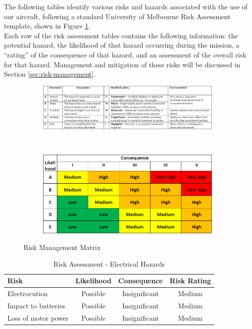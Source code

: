 \label{sec:risk-assessment}
The following tables identify various risks and hazards associated with the use of our aircraft, following a standard University of Melbourne Risk Assessment template, shown in Figure \ref{fig:risk-matrix}.\\

Each row of the risk assessment tables contains the following information: the potential hazard, the likelihood of that hazard occurring during the mission, a ``rating'' of the consequence of that hazard, and an assessment of the overall risk for that hazard. Management and mitigation of these risks will be discussed in Section \ref{sec:risk-management}.

\begin{figure}[H]
	
	\begin{subfigure}{\linewidth}
		\centerline{\includegraphics[width=550pt]{../Images/risk-matrix}}
	\end{subfigure}\\[2ex]
	
	\begin{subfigure}{\linewidth}
		\centerline{\includegraphics[width=300pt]{../Images/risk-matrix-2}}
	\end{subfigure}
	
	\caption{Risk Management Matrix}
	\label{fig:risk-matrix}
\end{figure}

\begin{table}[!h]
	\label{tab:risks-electrical}
	\centering
	\begin{tabularx}{\textwidth}{|Y|c|c|c|}
		\hline
		\textbf{Risk} & \textbf{Likelihood} & \textbf{Consequence} & \textbf{Risk Rating}\\
		\hline
		Electrocution & Possible & Insignificant & Medium\\
		\hline
		Impact to batteries & Possible & Insignificant & Medium\\
		\hline
		Loss of motor power & Possible & Insignificant & Medium\\
		\hline
	\end{tabularx} 
	\caption{Risk Assessment - Electrical Hazards}
\end{table}

